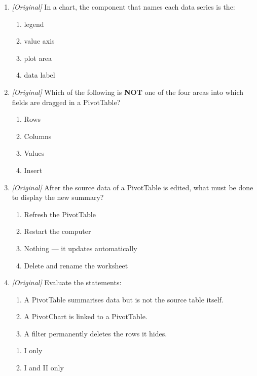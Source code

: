 \begin{enumerate}[label=\textbf{Q\arabic*.}, leftmargin=*]
\begin{enumerate}[label=\Alph*.]
    \item updates automatically
    \item is deleted
    \item is converted into a PivotTable
  \end{enumerate}
\item \textit{[Original]} In a chart, the component that names each data series
  is the:
  \begin{enumerate}[label=\Alph*.]
    \item legend
    \item value axis
    \item plot area
    \item data label
  \end{enumerate}
\item \textit{[Original]} Which of the following is \textbf{NOT} one of the four
  areas into which fields are dragged in a PivotTable?
  \begin{enumerate}[label=\Alph*.]
    \item Rows
    \item Columns
    \item Values
    \item Insert
  \end{enumerate}
\item \textit{[Original]} After the source data of a PivotTable is edited, what
  must be done to display the new summary?
  \begin{enumerate}[label=\Alph*.]
    \item Refresh the PivotTable
    \item Restart the computer
    \item Nothing --- it updates automatically
    \item Delete and rename the worksheet
  \end{enumerate}
\item \textit{[Original]} Evaluate the statements:
  \begin{enumerate}[label=\Roman*.]
    \item A PivotTable summarises data but is not the source table itself.
    \item A PivotChart is linked to a PivotTable.
    \item A filter permanently deletes the rows it hides.
  \end{enumerate}
  \begin{enumerate}[label=\Alph*.]
    \item I only
    \item I and II only

\end{enumerate}
\end{enumerate}
